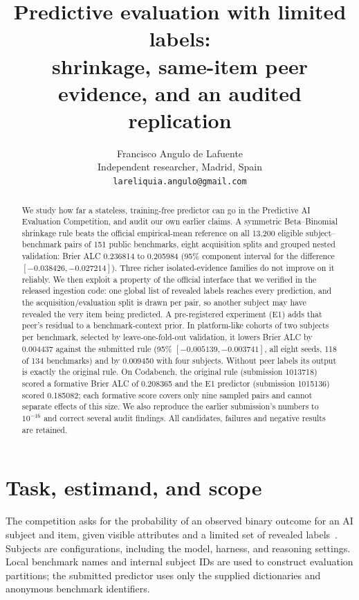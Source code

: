 \documentclass{article}
\title{Predictive evaluation with limited labels:\\
shrinkage, same-item peer evidence, and an audited replication}
\author{Francisco Angulo de Lafuente\\Independent researcher, Madrid, Spain\\
\texttt{lareliquia.angulo@gmail.com}}
\newcommand{\CBEONE}{0.185082}
\begin{document}
\maketitle

\begin{abstract}
We study how far a stateless, training-free predictor can go in the Predictive
AI Evaluation Competition, and audit our own earlier claims. A symmetric
Beta--Binomial shrinkage rule beats the official empirical-mean reference on
all 13,200 eligible subject--benchmark pairs of 151 public benchmarks, eight
acquisition splits and grouped nested validation: Brier ALC 0.236814 to
0.205984 (95\% component interval for the difference $[-0.038426,-0.027214]$).
Three richer isolated-evidence families do not improve on it reliably. We then
exploit a property of the official interface that we verified in the released
ingestion code: one global list of revealed labels reaches every prediction, and
the acquisition/evaluation split is drawn per pair, so another subject may have
revealed the very item being predicted. A pre-registered experiment (E1) adds
that peer's residual to a benchmark-context prior. In platform-like cohorts of
two subjects per benchmark, selected by leave-one-fold-out validation, it lowers
Brier ALC by 0.004437 against the submitted rule (95\% $[-0.005139,-0.003741]$,
all eight seeds, 118 of 134 benchmarks) and by 0.009450 with four subjects.
Without peer labels its output is exactly the original rule. On Codabench, the
original rule (submission 1013718) scored a formative Brier ALC of 0.208365 and
the E1 predictor (submission 1015136) scored \CBEONE{}; each formative score
covers only nine sampled pairs and cannot separate effects of this size. We also
reproduce the earlier submission's numbers to $10^{-16}$ and correct several
audit findings. All candidates, failures and negative results are retained.
\end{abstract}

\section{Task, estimand, and scope}
The competition asks for the probability of an observed binary outcome for an
AI subject and item, given visible attributes and a limited set of revealed
labels~\cite{competition}. Subjects are configurations, including the model,
harness, and reasoning settings. Local benchmark names and internal subject
IDs are used to construct evaluation partitions; the submitted predictor uses
only the supplied dictionaries and anonymous benchmark identifiers.
\end{document}

